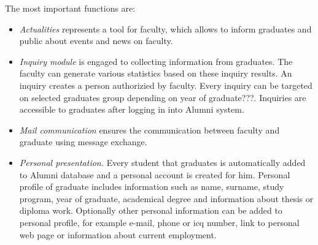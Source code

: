 \documentclass{iitsrc}[2006/14/02]
\begin{document}
The most important functions are:
\begin{itemize}

\item {\em Actualities} 
represents a tool for faculty, which allows to inform graduates and public about events and news on faculty.

\item {\em Inquiry module}
is engaged to collecting information from graduates. The faculty can generate various statistics based on these inquiry results. An inquiry creates a person authorizied by faculty. Every inquiry can be targeted on selected graduates group depending on year of graduate???. Inquiries are accessible to graduates after logging in into Alumni system.

\item {\em Mail communication} ensures the communication between faculty and graduate using message exchange.

\item {\em Personal presentation.}
Every student that graduates is automatically added to Alumni database and a personal account is created for him. Personal profile of graduate includes information such as name, surname, study program, year of graduate, academical degree and information about thesis or diploma work. Optionally other personal information can be added to personal profile, for example e-mail, phone or icq number, link to personal web page or information about current employment. 


\end{itemize}
\end{document}

